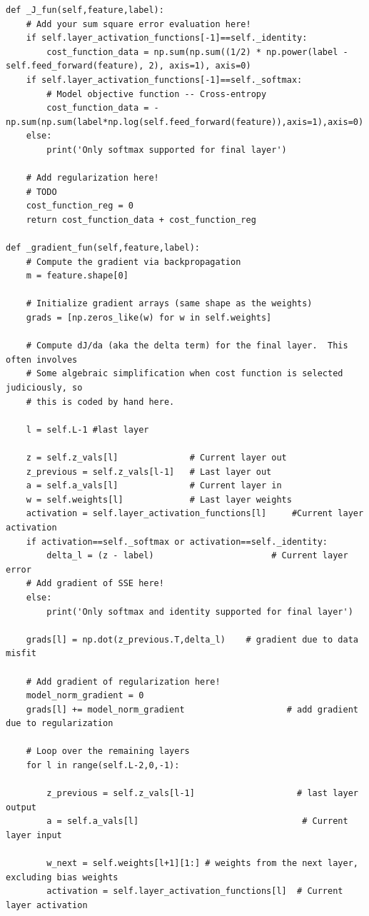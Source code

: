 \documentclass[12pt]{article}
\begin{document}
\begin{flushleft}
\begin{lstlisting}
def _J_fun(self,feature,label):
	# Add your sum square error evaluation here!
	if self.layer_activation_functions[-1]==self._identity:
		cost_function_data = np.sum(np.sum((1/2) * np.power(label - self.feed_forward(feature), 2), axis=1), axis=0)
	if self.layer_activation_functions[-1]==self._softmax:
		# Model objective function -- Cross-entropy 
		cost_function_data = -np.sum(np.sum(label*np.log(self.feed_forward(feature)),axis=1),axis=0)
	else:
		print('Only softmax supported for final layer')            
	
	# Add regularization here!
	# TODO
	cost_function_reg = 0
	return cost_function_data + cost_function_reg

def _gradient_fun(self,feature,label):
	# Compute the gradient via backpropagation
	m = feature.shape[0]
	
	# Initialize gradient arrays (same shape as the weights)
	grads = [np.zeros_like(w) for w in self.weights]
	
	# Compute dJ/da (aka the delta term) for the final layer.  This often involves 
	# Some algebraic simplification when cost function is selected judiciously, so
	# this is coded by hand here.
	
	l = self.L-1 #last layer
	
	z = self.z_vals[l]              # Current layer out
	z_previous = self.z_vals[l-1]   # Last layer out
	a = self.a_vals[l]              # Current layer in
	w = self.weights[l]             # Last layer weights
	activation = self.layer_activation_functions[l]     #Current layer activation
	if activation==self._softmax or activation==self._identity:
		delta_l = (z - label)                       # Current layer error
	# Add gradient of SSE here!
	else:
		print('Only softmax and identity supported for final layer') 
	
	grads[l] = np.dot(z_previous.T,delta_l)    # gradient due to data misfit
	
	# Add gradient of regularization here!
	model_norm_gradient = 0
	grads[l] += model_norm_gradient                    # add gradient due to regularization
	
	# Loop over the remaining layers
	for l in range(self.L-2,0,-1):
	
		z_previous = self.z_vals[l-1]                    # last layer output
		a = self.a_vals[l]                                # Current layer input
		
		w_next = self.weights[l+1][1:] # weights from the next layer, excluding bias weights
		activation = self.layer_activation_functions[l]  # Current layer activation
		

\end{lstlisting}
\end{flushleft}
\end{document}
